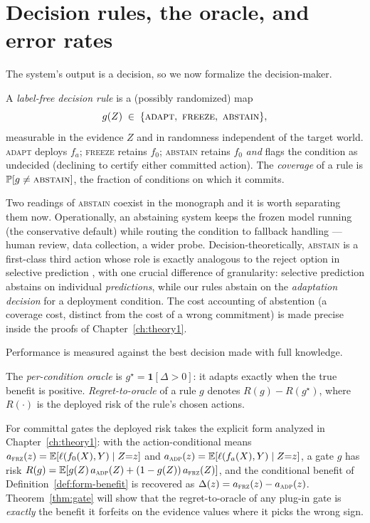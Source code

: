 \section{Decision rules, the oracle, and error rates}\label{sec:form-decisions}

The system's output is a decision, so we now formalize the decision-maker.

\begin{definition}\label{def:form-rule}
A \emph{label-free decision rule} is a (possibly randomized) map
\[
g(Z)\;\in\;\{\textsc{adapt},\ \textsc{freeze},\ \textsc{abstain}\},
\]
measurable in the evidence $Z$ and in randomness independent of the target
world. \textsc{adapt} deploys $f_a$; \textsc{freeze} retains $f_0$;
\textsc{abstain} retains $f_0$ \emph{and} flags the condition as undecided
(declining to certify either committed action). The \emph{coverage} of a
rule is $\Pr[g\neq\textsc{abstain}]$, the fraction of conditions on which it
commits.
\end{definition}

Two readings of \textsc{abstain} coexist in the monograph and it is worth
separating them now. Operationally, an abstaining system keeps the frozen
model running (the conservative default) while routing the condition to
fallback handling --- human review, data collection, a wider probe.
Decision-theoretically, \textsc{abstain} is a first-class third action whose
role is exactly analogous to the reject option in selective prediction
\cite{chow1970optimum, elyaniv2010selective, geifman2017selective}, with one
crucial difference of granularity: selective prediction abstains on
individual \emph{predictions}, while our rules abstain on the
\emph{adaptation decision} for a deployment condition. The cost accounting
of abstention (a coverage cost, distinct from the cost of a wrong
commitment) is made precise inside the proofs of Chapter~\ref{ch:theory1}.

Performance is measured against the best decision made with full knowledge.

\begin{definition}\label{def:form-regret}
The \emph{per-condition oracle} is $g^\star=\mathbf1[\Delta>0]$: it adapts
exactly when the true benefit is positive. \emph{Regret-to-oracle} of a rule
$g$ denotes $R(g)-R(g^\star)$, where $R(\cdot)$ is the deployed risk of the
rule's chosen actions.
\end{definition}

For committal gates the deployed risk takes the explicit form analyzed in
Chapter~\ref{ch:theory1}: with the action-conditional means
$a_{\textsc{frz}}(z)=\E[\ell(f_0(X),Y)\mid Z{=}z]$ and
$a_{\textsc{adp}}(z)=\E[\ell(f_a(X),Y)\mid Z{=}z]$, a gate $g$ has risk
$R(g)=\E[g(Z)\,a_{\textsc{adp}}(Z)+(1-g(Z))\,a_{\textsc{frz}}(Z)]$, and the
conditional benefit of Definition~\ref{def:form-benefit} is recovered as
$\Delta(z)=a_{\textsc{frz}}(z)-a_{\textsc{adp}}(z)$. Theorem~\ref{thm:gate}
will show that the regret-to-oracle of any plug-in gate is \emph{exactly}
the benefit it forfeits on the evidence values where it picks the wrong
sign.


